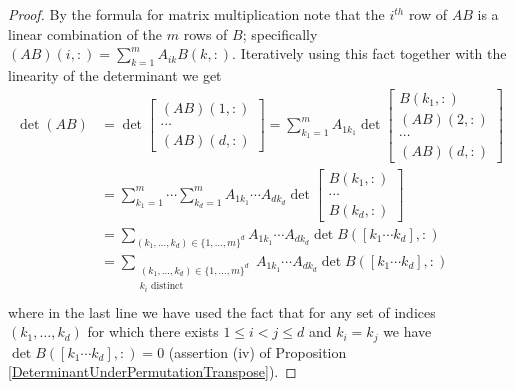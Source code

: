 \begin{proof}
By the formula for matrix multiplication note that the $i^{th}$ row of $AB$ is a linear combination of the $m$ rows of $B$; specifically $(AB)(i, :) = \sum_{k=1}^m A_{ik} B(k, :)$.  Iteratively using this fact together with the linearity of the determinant we get
\begin{align*}
\det(AB) &=  \det
\begin{bmatrix}
(AB)(1,  :)\\
\dotsb \\
 (AB)(d, :)
\end{bmatrix}
= \sum_{k_1 = 1}^m 
A_{1 k_1} \det \begin{bmatrix}
B(k_1,  :) \\
(AB)(2, :)\\
\dotsb \\
(AB)(d,  :)
\end{bmatrix} \\
&= \sum_{k_1 = 1}^m \dotsb \sum_{k_d=1}^m
A_{1 k_1}  \dotsb A_{d k_d} \det \begin{bmatrix}
B(k_1, :)\\
\dotsb \\
B(k_d, :)
\end{bmatrix} \\
&=\sum_{(k_1, \dotsc, k_d) \in \lbrace 1, \dotsc, m \rbrace^d}
A_{1 k_1}  \dotsb A_{d k_d} \det B([k_1 \dotsb k_d], :)\\
&=\sum_{\substack{(k_1, \dotsc, k_d) \in \lbrace 1, \dotsc, m \rbrace^d \\ k_i \text{ distinct} }}
A_{1 k_1}  \dotsb A_{d k_d} \det B([k_1 \dotsb k_d], :)\\
\end{align*}
where in the last line we have used the fact that for any set of indices $(k_1, \dotsc, k_d)$ for which there exists $1 \leq i < j \leq d$ and $k_i=k_j$ we have $\det B([k_1 \dotsb k_d], :) = 0$ (assertion (iv) of Proposition \ref{DeterminantUnderPermutationTranspose}).  


\end{proof}
